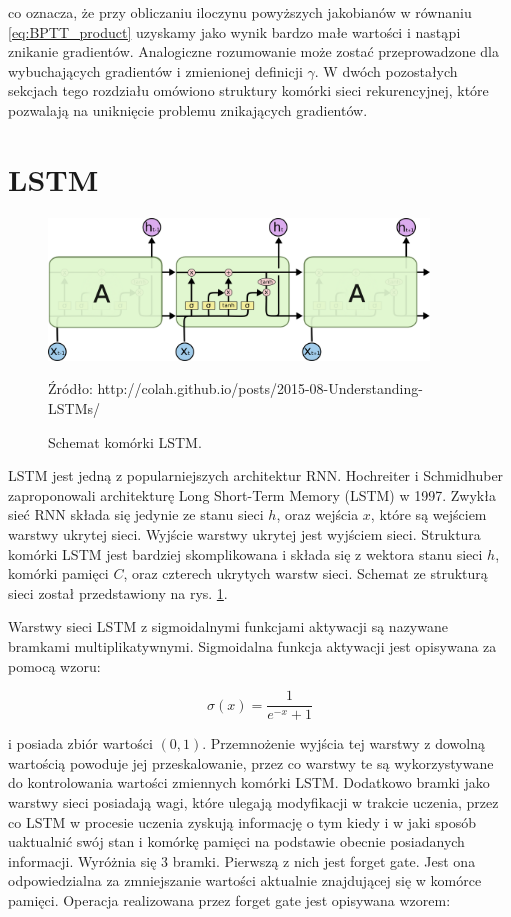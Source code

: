 \documentclass[oneside, mag]{mgr}
\begin{document}
co oznacza, że przy obliczaniu iloczynu powyższych jakobianów w równaniu \ref{eq:BPTT_product} uzyskamy jako wynik bardzo małe wartości i nastąpi znikanie gradientów. Analogiczne rozumowanie może zostać przeprowadzone dla wybuchających gradientów i zmienionej definicji $\gamma$. W dwóch pozostałych sekcjach tego rozdziału omówiono struktury komórki sieci rekurencyjnej, które pozwalają na uniknięcie problemu znikających gradientów. 


\section{LSTM}

\begin{figure}
\centering
	\includegraphics[width=0.90\textwidth]{img/lstm_colah.png}
	\caption{Schemat komórki LSTM.} Źródło: http://colah.github.io/posts/2015-08-Understanding-LSTMs/
	\label{fig:lstm}
\end{figure}

LSTM jest jedną z popularniejszych architektur RNN. Hochreiter i Schmidhuber zaproponowali architekturę Long Short-Term Memory (LSTM) \cite{LSTM} w 1997. Zwykła sieć RNN składa się jedynie ze stanu sieci $h$, oraz wejścia $x$, które są wejściem warstwy ukrytej sieci. Wyjście warstwy ukrytej jest wyjściem sieci. Struktura komórki LSTM jest bardziej skomplikowana i składa się z wektora stanu sieci $h$, komórki pamięci $C$, oraz czterech ukrytych warstw sieci. Schemat ze strukturą sieci został przedstawiony na rys. \ref{fig:lstm}.

Warstwy sieci LSTM z sigmoidalnymi funkcjami aktywacji są nazywane bramkami multiplikatywnymi. Sigmoidalna funkcja aktywacji jest opisywana za pomocą wzoru:

\begin{equation}
	\sigma(x) = \frac{1}{e^{-x} + 1}
\end{equation}

i posiada zbiór wartości $(0, 1)$. Przemnożenie wyjścia tej warstwy z dowolną wartością powoduje jej przeskalowanie, przez co warstwy te są wykorzystywane do kontrolowania wartości zmiennych komórki LSTM. Dodatkowo bramki jako warstwy sieci posiadają wagi, które ulegają modyfikacji w trakcie uczenia, przez co LSTM w procesie uczenia zyskują informację o tym kiedy i w jaki sposób uaktualnić swój stan i komórkę pamięci na podstawie obecnie posiadanych informacji. Wyróżnia się 3 bramki. Pierwszą z nich jest forget gate. Jest ona odpowiedzialna za zmniejszanie wartości aktualnie znajdującej się w komórce pamięci. Operacja realizowana przez forget gate jest opisywana wzorem: 
\end{document}
